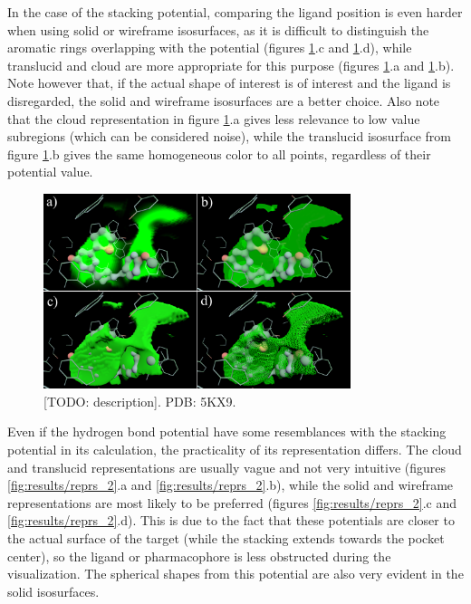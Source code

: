     In the case of the stacking potential, comparing the ligand position is even harder when using solid or wireframe isosurfaces, as it is difficult to distinguish the aromatic rings overlapping with the potential (figures \ref{fig:results/reprs_1}.c and \ref{fig:results/reprs_1}.d), while translucid and cloud are more appropriate for this purpose (figures \ref{fig:results/reprs_1}.a and \ref{fig:results/reprs_1}.b). Note however that, if the actual shape of interest is of interest and the ligand is disregarded, the solid and wireframe isosurfaces are a better choice. Also note that the cloud representation in figure \ref{fig:results/reprs_1}.a gives less relevance to low value subregions (which can be considered noise), while the translucid isosurface from figure \ref{fig:results/reprs_1}.b gives the same homogeneous color to all points, regardless of their potential value.

    \begin{figure}[H]
      \centering
      \includegraphics[width=0.8\textwidth]{figures/results/reprs_1.png}
      \caption{\label{fig:results/reprs_1} [TODO: description]. PDB: 5KX9.}
    \end{figure}

    Even if the hydrogen bond potential have some resemblances with the stacking potential in its calculation, the practicality of its representation differs. The cloud and translucid representations are usually vague and not very intuitive (figures \ref{fig:results/reprs_2}.a and \ref{fig:results/reprs_2}.b), while the solid and wireframe representations are most likely to be preferred (figures \ref{fig:results/reprs_2}.c and \ref{fig:results/reprs_2}.d). This is due to the fact that these potentials are closer to the actual surface of the target (while the stacking extends towards the pocket center), so the ligand or pharmacophore is less obstructed during the visualization. The spherical shapes from this potential are also very evident in the solid isosurfaces.

